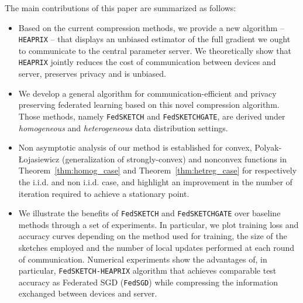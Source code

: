 \documentclass[twoside]{article}
\newcommand{\pl}{Polyak-\L{}ojasiewicz}
\begin{document}

The main contributions of this paper are summarized as follows:
\begin{itemize}
    \item Based on the current compression methods, we provide a new algorithm -- \texttt{HEAPRIX} -- that displays an unbiased estimator of the full gradient we ought to communicate to the central parameter server. We theoretically show that \texttt{HEAPRIX} jointly reduces the cost of communication between devices and server, preserves privacy and is unbiased.
    
    \item We develop a general algorithm for communication-efficient and privacy preserving federated learning based on this novel compression algorithm. 
Those methods, namely \texttt{FedSKETCH} and \texttt{FedSKETCHGATE}, are derived under \textit{homogeneous} and \textit{heterogeneous} data distribution settings.
   
    \item Non asymptotic analysis of our method is established for convex, \pl\: (generalization of strongly-convex) and nonconvex functions in Theorem~\ref{thm:homog_case} and Theorem~\ref{thm:hetreg_case} for respectively the i.i.d. and non i.i.d. case,  and highlight an improvement in the number of iteration required to achieve a stationary point.
    
    \item We illustrate the benefits of \texttt{FedSKETCH} and \texttt{FedSKETCHGATE} over baseline methods through a set of experiments. In particular, we plot training loss and accuracy curves depending on the method used for training, the size of the sketches employed and the number of local updates performed at each round of communication. Numerical experiments show the advantages of, in particular, \texttt{FedSKETCH-HEAPRIX} algorithm that achieves comparable test accuracy as Federated SGD (\texttt{FedSGD}) while compressing the information exchanged between devices and server.
    
\end{itemize}
\end{document}
